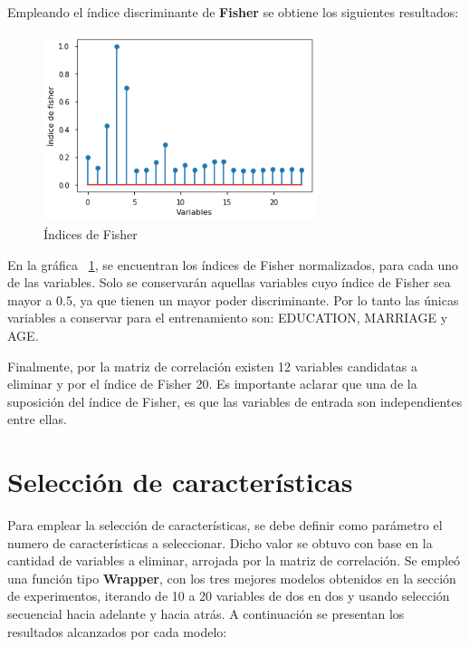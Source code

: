 \documentclass[conference]{IEEEtran}
\begin{document}
Empleando el índice discriminante de \textbf{Fisher} se obtiene los siguientes resultados:
\begin{center}
    \begin{figure}[H]
        \hfill
     \centerline{\includegraphics[width=8cm]{fisher.png}}
    \caption{Índices de Fisher}
    \label{fig:indexFisher}
    \end{figure}  
\end{center}
En la gráfica ~\ref{fig:indexFisher}, se encuentran los índices de Fisher normalizados, para cada uno de las variables. Solo se conservarán aquellas variables cuyo índice de Fisher sea mayor a 0.5, ya que tienen un mayor poder discriminante. Por lo tanto las únicas variables a conservar para el entrenamiento son: EDUCATION, MARRIAGE y AGE.

Finalmente, por la matriz de correlación existen 12 variables candidatas a eliminar y por el índice de Fisher 20. Es importante aclarar que una de la suposición del índice de Fisher, es que las variables de entrada son independientes entre ellas.

\section{Selección de características}
Para emplear la selección de características, se debe definir como parámetro el numero de características a seleccionar. Dicho valor se obtuvo con base en la cantidad de variables a eliminar, arrojada por la matriz de correlación. Se empleó una función tipo \textbf{Wrapper}, con los tres mejores modelos obtenidos en la sección de experimentos, iterando de 10 a 20 variables de dos en dos y usando selección secuencial hacia adelante y hacia atrás.
A continuación se presentan los resultados alcanzados por cada modelo:
\end{document}
